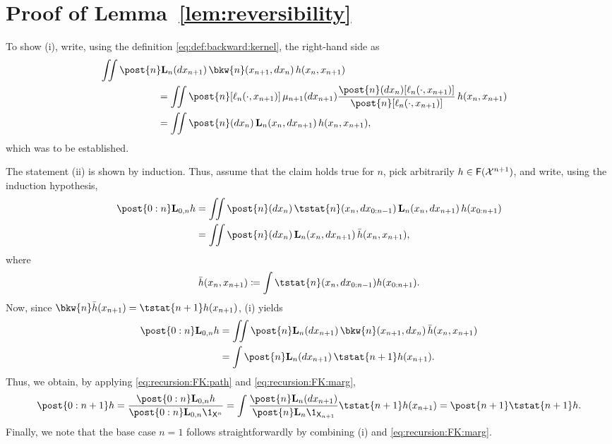 \section{Proof of Lemma~\ref{lem:reversibility}}
\label{sec:proof:lem:reversibility}

To show (i), write, using the definition \eqref{eq:def:backward:kernel}, the right-hand side as 
\begin{align*}
\lefteqn{\iint \post{n} \uk{n}(\rmd x_{n + 1}) \, \bkw{n}(x_{n + 1}, \rmd x_n) \, h(x_n, x_{n + 1})} \hspace{20mm} \\
&= \iint \post{n}[\ud{n}(\cdot, x_{n + 1})] \, \mu_{n + 1}(\rmd x_{n + 1}) \frac{\post{n}(\rmd x_n) [\ud{n}(\cdot, x_{n + 1})]}{\post{n}[\ud{n}(\cdot, x_{n + 1})]} \, h(x_n, x_{n + 1}) \\
&= \iint \post{n}(\rmd x_n) \, \uk{n}(x_n, \rmd x_{n + 1}) \, h(x_n, x_{n + 1}), 
\end{align*}
which was to be established. 

The statement (ii) is shown by induction. Thus, assume that the claim holds true for $n$, pick arbitrarily $h \in \mathsf{F}(\mathcal{X}^{n + 1})$, and write, using the induction hypothesis, 
\begin{align*}
\post{0:n} \uk{0, n} h &= \iint \post{n}(\rmd x_n) \, \tstat{n}(x_n, \rmd x_{0:n - 1}) \, \uk{n}(x_n, \rmd x_{n + 1}) \, h(x_{0:n + 1}) \\
&= \iint \post{n}(\rmd x_n) \, \uk{n}(x_n, \rmd x_{n + 1}) \, \bar{h}(x_n, x_{n + 1}), 
\end{align*}
where 
$$
\bar{h}(x_n, x_{n + 1}) \eqdef \int \tstat{n}(x_n, \rmd x_{0:n - 1}) h(x_{0:n + 1}). 
$$
Now, since $\bkw{n} \bar{h}(x_{n + 1}) = \tstat{n + 1} h(x_{n + 1})$, (i) yields
\begin{align*} 
\post{0:n} \uk{0, n} h 
&= \iint \post{n} \uk{n}(\rmd x_{n + 1}) \, \bkw{n}(x_{n + 1}, \rmd x_n) \, \bar{h}(x_n, x_{n + 1}) \\
&= \int \post{n} \uk{n}(\rmd x_{n + 1}) \, \tstat{n + 1} h(x_{n + 1}). 
\end{align*}
Thus, we obtain, by applying \eqref{eq:recursion:FK:path} and \eqref{eq:recursion:FK:marg},  
$$
\post{0:n + 1} h = \frac{\post{0:n} \uk{0, n} h}{\post{0:n} \uk{0, n} \1_{\Xset^n}} 
= \int \frac{\post{n} \uk{n}(\rmd x_{n + 1})}{\post{n} \uk{n} \1_{\Xset_{n + 1}}} \tstat{n + 1} h(x_{n + 1}) = \post{n + 1} \tstat{n + 1} h. 
$$
Finally, we note that the base case $n = 1$ follows straightforwardly by combining (i) and \eqref{eq:recursion:FK:marg}. 
